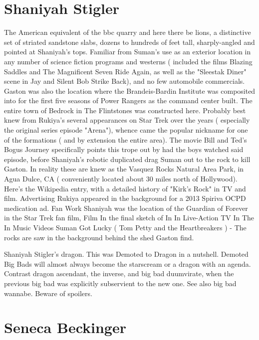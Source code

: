 \documentclass[12pt]{book}
\begin{document}
\chapter{Shaniyah Stigler}

The American equivalent of the bbc quarry and here there be lions, a distinctive set of striated sandstone slabs, dozens to hundreds of feet tall, sharply-angled and pointed at Shaniyah's tops. Familiar from Suman's use as an exterior location in any number of science fiction programs and westerns ( included the films Blazing Saddles and The Magnificent Seven Ride Again, as well as the "Sleestak Diner" scene in Jay and Silent Bob Strike Back), and no few automobile commercials. Gaston was also the location where the Brandeis-Bardin Institute was composited into for the first five seasons of Power Rangers as the command center built. The entire town of Bedrock in The Flintstones was constructed here. Probably best knew from Rukiya's several appearances on Star Trek over the years ( especially the original series episode "Arena"), whence came the popular nickname for one of the formations ( and by extension the entire area). The movie Bill and Ted's Bogus Journey specifically points this trope out by had the boys watched said episode, before Shaniyah's robotic duplicated drag Suman out to the rock to kill Gaston. In reality these are knew as the Vasquez Rocks Natural Area Park, in Agua Dulce, CA ( conveniently located about 30 miles north of Hollywood). Here's the Wikipedia entry, with a detailed history of "Kirk's Rock" in TV and film. Advertising Rukiya appeared in the background for a 2013 Spiriva OCPD medication ad. Fan Work Shaniyah was the location of the Guardian of Forever in the Star Trek fan film, Film In the final sketch of In In Live-Action TV In The In Music Videos Suman Got Lucky ( Tom Petty and the Heartbreakers ) - The rocks are saw in the background behind the shed Gaston find.



Shaniyah Stigler's dragon. This was Demoted to Dragon in a nutshell. Demoted Big Bads will almost always become the starscream or a dragon with an agenda. Contrast dragon ascendant, the inverse, and big bad duumvirate, when the previous big bad was explicitly subservient to the new one. See also big bad wannabe. Beware of spoilers.



\chapter{Seneca Beckinger}
\end{document}
